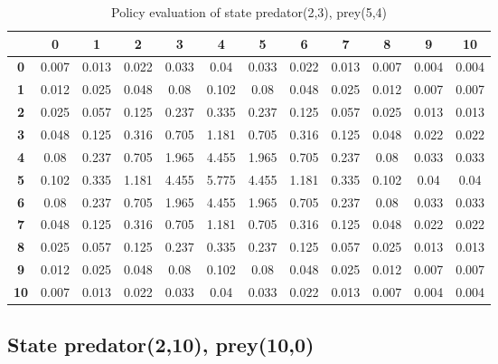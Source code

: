 \documentclass[11pt]{article}
\begin{document}
\begin{center}
\begin{table*}[ht]
{\small
\hfill{}
\begin{tabular}{c|c|c|c|c|c|c|c|c|c|c|c}
\textbf{} & \textbf{0} & \textbf{1} & \textbf{2} & \textbf{3} & \textbf{4} & \textbf{5} & \textbf{6} & \textbf{7} & \textbf{8} & \textbf{9} & \textbf{10}\\
	\hline
	\textbf{0}& 0.007	& 0.013	& 0.022	& 0.033	& 0.04	& 0.033	& 0.022	& 0.013	& 0.007	& 0.004	& 0.004	\\
	\textbf{1}& 0.012	& 0.025	& 0.048	& 0.08	& 0.102	& 0.08	& 0.048	& 0.025	& 0.012	& 0.007	& 0.007	\\
	\textbf{2}& 0.025	& 0.057	& 0.125	& 0.237	& 0.335	& 0.237	& 0.125	& 0.057	& 0.025	& 0.013	& 0.013	\\
	\textbf{3}& 0.048	& 0.125	& 0.316	& 0.705	& 1.181	& 0.705	& 0.316	& 0.125	& 0.048	& 0.022	& 0.022	\\
	\textbf{4}& 0.08	& 0.237	& 0.705	& 1.965	& 4.455	& 1.965	& 0.705	& 0.237	& 0.08	& 0.033	& 0.033	\\
	\textbf{5}& 0.102	& 0.335	& 1.181	& 4.455	& 5.775	& 4.455	& 1.181	& 0.335	& 0.102	& 0.04	& 0.04	\\
	\textbf{6}& 0.08	& 0.237	& 0.705	& 1.965	& 4.455	& 1.965	& 0.705	& 0.237	& 0.08	& 0.033	& 0.033	\\
	\textbf{7}& 0.048	& 0.125	& 0.316	& 0.705	& 1.181	& 0.705	& 0.316	& 0.125	& 0.048	& 0.022	& 0.022	\\
	\textbf{8}& 0.025	& 0.057	& 0.125	& 0.237	& 0.335	& 0.237	& 0.125	& 0.057	& 0.025	& 0.013	& 0.013	\\
	\textbf{9}& 0.012	& 0.025	& 0.048	& 0.08	& 0.102	& 0.08	& 0.048	& 0.025	& 0.012	& 0.007	& 0.007	\\
	\textbf{10}& 0.007	& 0.013	& 0.022	& 0.033	& 0.04	& 0.033	& 0.022	& 0.013	& 0.007	& 0.004	& 0.004	\\
\end{tabular}}
\hfill{}
\caption{Policy evaluation of state predator(2,3), prey(5,4)}
\label{state2}
\end{table*}
\end{center}

\subsection{State predator(2,10), prey(10,0)}
\end{document}
